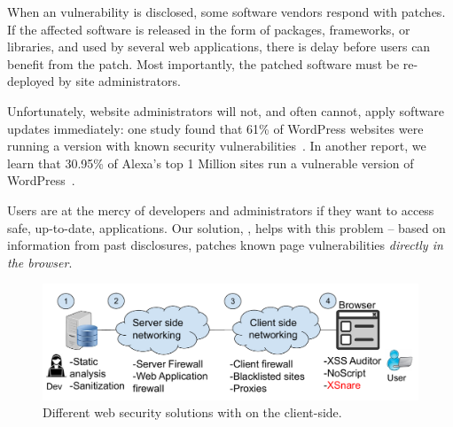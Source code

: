 When an \xss vulnerability is disclosed, some software vendors respond
with patches. If the affected software is released in the form of
packages, frameworks, or libraries, and used by several web
applications, there is delay before users can benefit from the
patch. Most importantly, the patched software must be re-deployed by
site administrators.

Unfortunately, website administrators will not, and often cannot,
apply software updates immediately: one study found
that 61\% of WordPress websites were running a version with known
security vulnerabilities~\cite{Sucuri}. In another report, we learn
that 30.95\% of Alexa's top 1 Million sites run a vulnerable version
of WordPress~\cite{wpwhitesecurity}.

Users are at the mercy of developers and administrators if
they want to access safe, up-to-date, applications. Our solution, \sys,
helps with this problem -- based on information from past disclosures,
\sys patches known page vulnerabilities \emph{directly in the browser}.

\begin{figure}[h]
  \includegraphics[scale=0.37]{img/web_app_architecture.pdf}
  \caption{Different web security solutions with \sys on the client-side.}
  \label{fig:web_architecture}
\end{figure}

